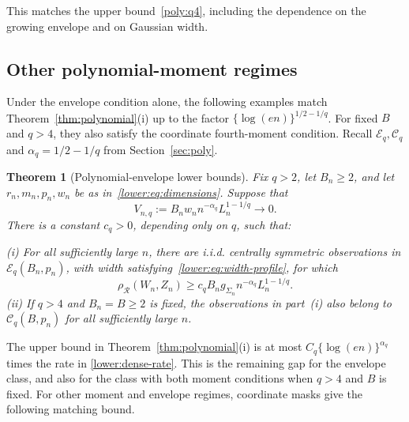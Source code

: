 \documentclass[11pt,letterpaper]{article}
\newenvironment{vSixBlock}{\color{magenta}}{}
\newtheorem{theorem}{Theorem}
\theoremstyle{remark}
\newcommand{\rh}{\rho_{\mathcal R}}
\begin{document}
\begin{vSixBlock}
This matches the upper bound~\eqref{poly:q4}, including the
dependence on the growing envelope and on Gaussian width.

\subsection{Other polynomial-moment regimes}

Under the envelope condition alone, the following examples match
Theorem~\ref{thm:polynomial}\textup{(i)} up to the factor
\(\{\log(en)\}^{1/2-1/q}\). For fixed \(B\) and \(q>4\),
they also satisfy the coordinate fourth-moment condition. Recall
\(\mathcal E_q,\mathcal C_q\) and \(\alpha_q=1/2-1/q\)
from Section~\ref{sec:poly}.

\begin{theorem}[Polynomial-envelope lower bounds]\label{lower:dense}
Fix \(q>2\), let \(B_n\ge2\), and let
\(r_n,m_n,p_n,w_n\) be as in~\eqref{lower:eq:dimensions}.
Suppose that
\[
 V_{n,q}:=B_n w_n n^{-\alpha_q}L_n^{1-1/q}\longrightarrow0.
\]
There is a constant \(c_q>0\), depending only on \(q\), such that:

\noindent\textup{(i)} For all sufficiently large \(n\), there are
i.i.d. centrally symmetric observations in \(\mathcal E_q(B_n,p_n)\),
with width satisfying~\eqref{lower:eq:width-profile}, for which
\begin{equation}
 \rh(W_n,Z_n)\ge c_q B_n g_{\Sigma_n}n^{-\alpha_q}L_n^{1-1/q}.
 \label{lower:dense-rate}
\end{equation}
\noindent\textup{(ii)} If \(q>4\) and \(B_n=B\ge2\) is fixed,
the observations in part~\textup{(i)} also belong to
\(\mathcal C_q(B,p_n)\) for all sufficiently large \(n\).
\end{theorem}

The upper bound in Theorem~\ref{thm:polynomial}\textup{(i)} is
at most \(C_q\{\log(en)\}^{\alpha_q}\) times the rate in
\eqref{lower:dense-rate}. This is the remaining gap for the envelope
class, and also for the class with both moment conditions when
\(q>4\) and \(B\) is fixed. For other moment and envelope regimes,
coordinate masks give the following matching bound.


\end{vSixBlock}
\end{document}
